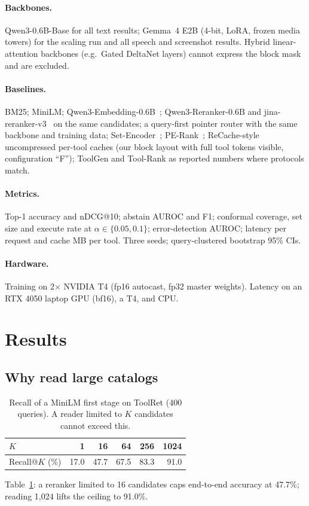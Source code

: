 \documentclass[sigconf,review,anonymous]{acmart}
\begin{document}
\paragraph{Backbones.} Qwen3-0.6B-Base for all text results; Gemma~4 E2B (4-bit, LoRA, frozen media towers) for the scaling run and all speech and screenshot results. Hybrid linear-attention backbones (e.g.\ Gated DeltaNet layers) cannot express the block mask and are excluded.

\paragraph{Baselines.} BM25; MiniLM; Qwen3-Embedding-0.6B~\cite{zhang2025qwen3emb}; Qwen3-Reranker-0.6B and jina-reranker-v3~\cite{wang2025jinav3} on the same candidates; a query-first pointer router with the same backbone and training data; Set-Encoder~\cite{schlatt2025setencoder}; PE-Rank~\cite{liu2025perank}; ReCache-style uncompressed per-tool caches (our block layout with full tool tokens visible, configuration ``F''); ToolGen and Tool-Rank as reported numbers where protocols match.

\paragraph{Metrics.} Top-1 accuracy and nDCG@10; abstain AUROC and F1; conformal coverage, set size and execute rate at $\alpha\in\{0.05,0.1\}$; error-detection AUROC; latency per request and cache MB per tool. Three seeds; query-clustered bootstrap 95\% CIs.

\paragraph{Hardware.} Training on 2$\times$ NVIDIA T4 (fp16 autocast, fp32 master weights). Latency on an RTX 4050 laptop GPU (bf16), a T4, and CPU.

\section{Results}
\subsection{Why read large catalogs}
\begin{table}[t]
\caption{Recall of a MiniLM first stage on ToolRet (400 queries). A reader limited to $K$ candidates cannot exceed this.}
\label{tab:recall}
\begin{tabular}{lrrrrr}
\toprule
$K$ & 1 & 16 & 64 & 256 & 1024\\
\midrule
Recall@$K$ (\%) & 17.0 & 47.7 & 67.5 & 83.3 & 91.0\\
\bottomrule
\end{tabular}
\end{table}
Table~\ref{tab:recall}: a reranker limited to 16 candidates caps end-to-end accuracy at 47.7\%; reading 1{,}024 lifts the ceiling to 91.0\%.
\end{document}
